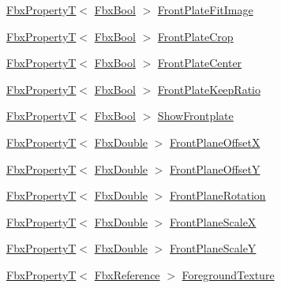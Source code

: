 \begin{DoxyCompactItemize}
\hyperlink{class_fbx_property_t}{Fbx\+PropertyT}$<$ \hyperlink{fbxtypes_8h_a92e0562b2fe33e76a242f498b362262e}{Fbx\+Bool} $>$ \hyperlink{class_fbx_camera_a98c919c1ec1398479c859357d3f454d7}{Front\+Plate\+Fit\+Image}
\item 
\hyperlink{class_fbx_property_t}{Fbx\+PropertyT}$<$ \hyperlink{fbxtypes_8h_a92e0562b2fe33e76a242f498b362262e}{Fbx\+Bool} $>$ \hyperlink{class_fbx_camera_af409f4d6dd0b68de9a3e0c2f17644362}{Front\+Plate\+Crop}
\item 
\hyperlink{class_fbx_property_t}{Fbx\+PropertyT}$<$ \hyperlink{fbxtypes_8h_a92e0562b2fe33e76a242f498b362262e}{Fbx\+Bool} $>$ \hyperlink{class_fbx_camera_ae7a43caba31795438a1ca41926a8e31c}{Front\+Plate\+Center}
\item 
\hyperlink{class_fbx_property_t}{Fbx\+PropertyT}$<$ \hyperlink{fbxtypes_8h_a92e0562b2fe33e76a242f498b362262e}{Fbx\+Bool} $>$ \hyperlink{class_fbx_camera_aa4066eaf0f9d506db8b83353db3e4ef7}{Front\+Plate\+Keep\+Ratio}
\item 
\hyperlink{class_fbx_property_t}{Fbx\+PropertyT}$<$ \hyperlink{fbxtypes_8h_a92e0562b2fe33e76a242f498b362262e}{Fbx\+Bool} $>$ \hyperlink{class_fbx_camera_adcb25c847c2d7d471c836722ce1289ff}{Show\+Frontplate}
\item 
\hyperlink{class_fbx_property_t}{Fbx\+PropertyT}$<$ \hyperlink{fbxtypes_8h_a171e72a1c46fc15c1a6c9c31948c1c5b}{Fbx\+Double} $>$ \hyperlink{class_fbx_camera_ad15249c2dceb1d0cc2b5913c0efd9b18}{Front\+Plane\+OffsetX}
\item 
\hyperlink{class_fbx_property_t}{Fbx\+PropertyT}$<$ \hyperlink{fbxtypes_8h_a171e72a1c46fc15c1a6c9c31948c1c5b}{Fbx\+Double} $>$ \hyperlink{class_fbx_camera_acf005c234e34ef2b44fadf4db42be655}{Front\+Plane\+OffsetY}
\item 
\hyperlink{class_fbx_property_t}{Fbx\+PropertyT}$<$ \hyperlink{fbxtypes_8h_a171e72a1c46fc15c1a6c9c31948c1c5b}{Fbx\+Double} $>$ \hyperlink{class_fbx_camera_ac50922c82f1509c5f4f9e5c328ede671}{Front\+Plane\+Rotation}
\item 
\hyperlink{class_fbx_property_t}{Fbx\+PropertyT}$<$ \hyperlink{fbxtypes_8h_a171e72a1c46fc15c1a6c9c31948c1c5b}{Fbx\+Double} $>$ \hyperlink{class_fbx_camera_a13396eaf60196ca60b78e3c05ee74021}{Front\+Plane\+ScaleX}
\item 
\hyperlink{class_fbx_property_t}{Fbx\+PropertyT}$<$ \hyperlink{fbxtypes_8h_a171e72a1c46fc15c1a6c9c31948c1c5b}{Fbx\+Double} $>$ \hyperlink{class_fbx_camera_a48072957694967921a9b9eccfadc6dce}{Front\+Plane\+ScaleY}
\item 
\hyperlink{class_fbx_property_t}{Fbx\+PropertyT}$<$ \hyperlink{fbxtypes_8h_a44df6a2eec915cf27cd481e5c5e48a24}{Fbx\+Reference} $>$ \hyperlink{class_fbx_camera_aeb121a9199a538fa7825bc26d326b7f9}{Foreground\+Texture}

\end{DoxyCompactItemize}
